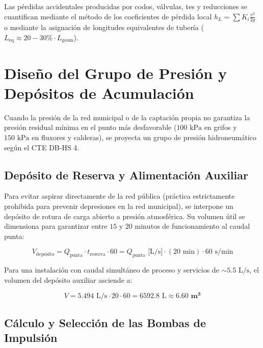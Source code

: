 \documentclass{report}
\begin{document}
Las pérdidas accidentales producidas por codos, válvulas, tes y reducciones se cuantifican mediante el método de los coeficientes de pérdida local $h_L = \sum K_i \frac{v^2}{2g}$ o mediante la asignación de longitudes equivalentes de tubería ($L_{\text{eq}} \approx 20-30\% \cdot L_{\text{geom}}$).



\section{Diseño del Grupo de Presión y Depósitos de Acumulación}

Cuando la presión de la red municipal o de la captación propia no garantiza la presión residual mínima en el punto más desfavorable ($100\text{ kPa}$ en grifos y $150\text{ kPa}$ en fluxores y calderas), se proyecta un grupo de presión hidroneumático según el CTE DB-HS 4.



\subsection{Depósito de Reserva y Alimentación Auxiliar}

Para evitar aspirar directamente de la red pública (práctica estrictamente prohibida para prevenir depresiones en la red municipal), se interpone un depósito de rotura de carga abierto a presión atmosférica. Su volumen útil se dimensiona para garantizar entre $15\text{ y }20\text{ minutos}$ de funcionamiento al caudal punta:

\begin{equation}

    V_{\text{depósito}} = Q_{\text{punta}} \cdot t_{\text{reserva}} \cdot 60 = Q_{\text{punta}}\text{ [L/s]} \cdot (20\text{ min}) \cdot 60\text{ s/min}

\end{equation}

Para una instalación con caudal simultáneo de proceso y servicios de $\sim 5.5\text{ L/s}$, el volumen del depósito auxiliar asciende a:

\begin{equation}

    V = 5.494\text{ L/s} \cdot 20 \cdot 60 = 6592.8\text{ L} \approx \mathbf{6.60\text{ m}^3}

\end{equation}



\subsection{Cálculo y Selección de las Bombas de Impulsión}
\end{document}
